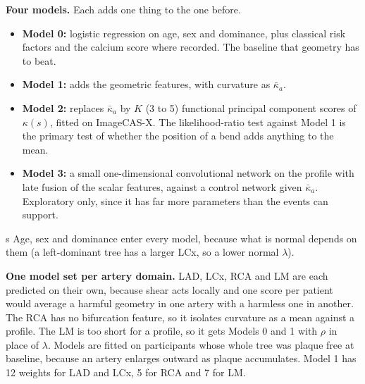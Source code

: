 \documentclass[11pt,a4paper]{article}
\begin{document}
\textbf{Four models.} Each adds one thing to the one before.
\begin{itemize}
  \item \textbf{Model 0:} logistic regression on age, sex and dominance, plus classical risk factors
    and the calcium score where recorded. The baseline that geometry has to beat.
  \item \textbf{Model 1:} adds the geometric features, with curvature as $\bar\kappa_a$.
  \item \textbf{Model 2:} replaces $\bar\kappa_a$ by $K$ (3 to 5) functional principal component scores of
    $\kappa(s)$, fitted on ImageCAS-X. The likelihood-ratio test against Model 1 is the primary test of
    whether the position of a bend adds anything to the mean.
  \item \textbf{Model 3:} a small one-dimensional convolutional network on the profile with late fusion of
    the scalar features, against a control network given $\bar\kappa_a$. Exploratory only, since it has far
    more parameters than the events can support.
\end{itemize}s
Age, sex and dominance enter every model, because what is normal depends on them (a left-dominant tree
has a larger LCx, so a lower normal $\lambda$).

\textbf{One model set per artery domain.} LAD, LCx, RCA and LM are each predicted on their own,
because shear acts locally and one score per patient would average a harmful geometry in one artery
with a harmless one in another. The RCA has no bifurcation feature, so it isolates curvature as a mean
against a profile. The LM is too short for a profile, so it gets Models 0 and 1 with $\rho$ in place of
$\lambda$. Models are fitted on participants whose whole tree was plaque free at baseline, because an
artery enlarges outward as plaque accumulates. Model 1 has 12 weights for LAD and LCx, 5 for RCA and 7
for LM.
\end{document}
